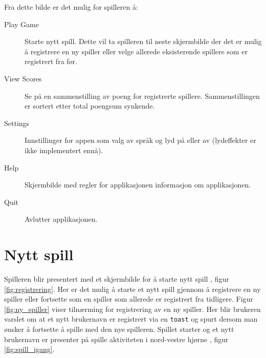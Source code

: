 Fra dette bilde er det mulig for spilleren å: 
\begin{description}
\item[Play Game] Starte nytt spill. Dette vil ta spilleren til neste skjermbilde der det er mulig å registrere en ny spiller eller velge allerede eksisterende spillere som er registrert fra før.
\item[View Scores] Se på en sammenstilling av poeng for registrerte spillere. Sammenstillingen er sortert etter total poengsum synkende.
\item[Settings] Innstillinger for appen som valg av språk og lyd på eller av (lydeffekter er ikke implementert ennå).
\item[Help] Skjermbilde med regler for applikasjonen informasjon om applikasjonen. 
\item[Quit] Avlutter applikasjonen. 
\end{description}


\section{Nytt spill}

Spilleren blir presentert med et skjermbilde for å starte nytt spill , figur \ref{fig:registrering}. Her er det mulig å starte et nytt spill gjennom å registrere en ny spiller eller fortsette som en spiller som allerede er registrert fra tidligere. Figur \ref{fig:ny_spiller} viser tilnærming for registrering av en ny spiller. Her blir brukeren varslet om at et nytt brukernavn er registrert via en \texttt{toast} og spurt dersom man ønsker å fortsette å spille med den nye spilleren. Spillet starter og et nytt brukernavn er presenter på spille aktiviteten i nord-vestre hjørne , figur \ref{fig:spill_igang}.

